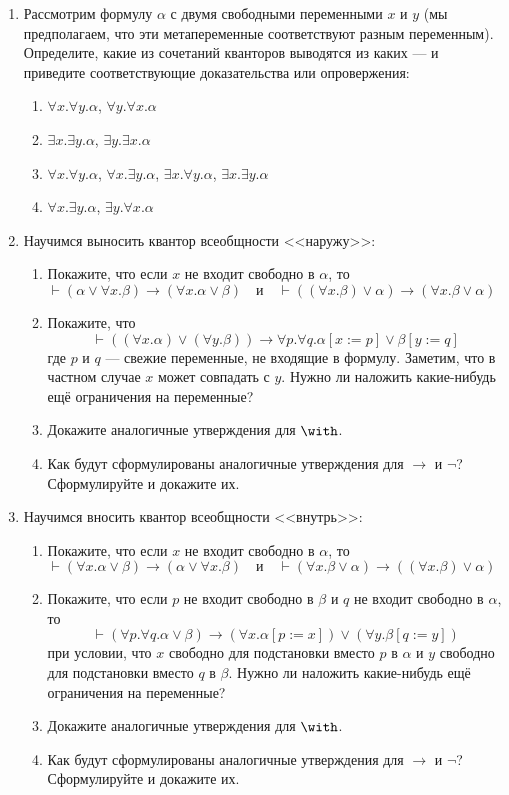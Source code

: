 \documentclass[10pt,a4paper,oneside]{article}
\begin{document}
\begin{enumerate}
\item Рассмотрим формулу $\alpha$ с двумя свободными переменными $x$ и $y$ (мы предполагаем,
что эти метапеременные соответствуют разным переменным).
Определите, какие из сочетаний кванторов выводятся из каких --- и приведите соответствующие
доказательства или опровержения:
\begin{enumerate}
\item $\forall x.\forall y.\alpha$, $\forall y.\forall x.\alpha$
\item $\exists x.\exists y.\alpha$, $\exists y.\exists x.\alpha$
\item $\forall x.\forall y.\alpha$, $\forall x.\exists y.\alpha$, $\exists x.\forall y.\alpha$, $\exists x.\exists y.\alpha$
\item $\forall x.\exists y.\alpha$, $\exists y.\forall x.\alpha$
\end{enumerate}
 
\item Научимся выносить квантор всеобщности <<наружу>>:
\begin{enumerate}
\item Покажите, что если $x$ не входит свободно в $\alpha$, то
$$
\vdash(\alpha \vee \forall x.\beta) \rightarrow (\forall x.\alpha\vee\beta)\quad
\mbox{и}\quad
\vdash((\forall x.\beta)\vee\alpha) \rightarrow (\forall x.\beta\vee\alpha)\quad
$$
\item Покажите, что $$\vdash((\forall x.\alpha) \vee (\forall y.\beta)) \rightarrow \forall p.\forall q.\alpha[x:=p]\vee\beta[y := q]$$
где $p$ и $q$ --- свежие переменные, не входящие в формулу. Заметим, что в частном случае $x$ может совпадать с $y$.
Нужно ли наложить какие-нибудь ещё ограничения на переменные?
\item Докажите аналогичные утверждения для $\with$.
\item Как будут сформулированы аналогичные утверждения для $\rightarrow$ и $\neg$? Сформулируйте и докажите их.
\end{enumerate}

\item Научимся вносить квантор всеобщности <<внутрь>>:
\begin{enumerate}
\item Покажите, что если $x$ не входит свободно в $\alpha$, то
$$
\vdash (\forall x.\alpha\vee\beta)\rightarrow(\alpha \vee \forall x.\beta)\quad
\mbox{и}\quad
\vdash (\forall x.\beta\vee\alpha)\rightarrow((\forall x.\beta)\vee\alpha)\quad
$$

\item Покажите, что если $p$ не входит свободно в $\beta$ и $q$ не входит свободно в $\alpha$, то
$$\vdash(\forall p.\forall q.\alpha\vee\beta) \rightarrow (\forall x.\alpha[p := x]) \vee (\forall y.\beta[q := y])$$
при условии, что $x$ свободно для подстановки вместо $p$ в $\alpha$ и $y$ свободно для подстановки вместо $q$ в $\beta$.
Нужно ли наложить какие-нибудь ещё ограничения на переменные?
\item Докажите аналогичные утверждения для $\with$.
\item Как будут сформулированы аналогичные утверждения для $\rightarrow$ и $\neg$? Сформулируйте и докажите их.
\end{enumerate}


\end{enumerate}
\end{document}
